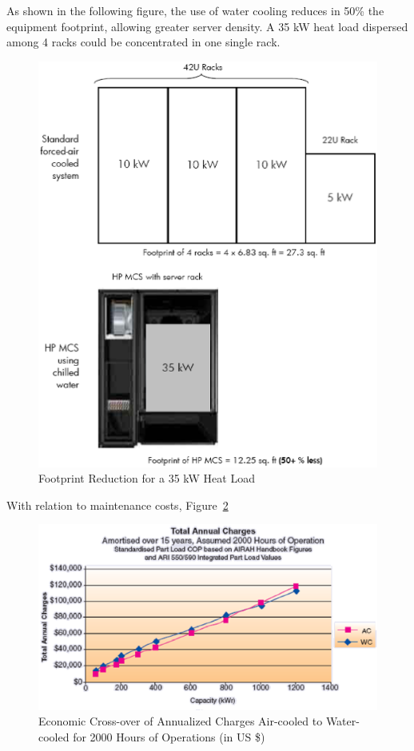                 As shown in the following figure, the use of water cooling reduces in 50\% the equipment footprint, allowing greater server density. A 35 kW heat load dispersed among 4 racks could be concentrated in one single rack.
                \begin{figure}[h!tb]
                    \centering
                    \includegraphics[scale=0.5]{graphics/footprint_reduction_for_35_heat_load}
                    \caption{Footprint Reduction for a 35 kW Heat Load}
                    \label{fig:footprint_reduction_for_35_heat_load}
                \end{figure}
                With relation to maintenance costs, Figure~\ref{fig:economic_crossover_annualized} \cite{}
                \begin{figure}[h!tb]
                    \centering
                    \includegraphics[scale=0.8]{graphics/economic_crossover_annualized}
                    \caption{Economic Cross-over of Annualized Charges Air-cooled to Water-cooled for 2000 Hours of Operations (in US \$)}
                    \label{fig:economic_crossover_annualized}
                \end{figure}
